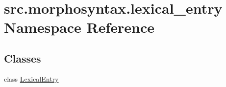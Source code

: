 \hypertarget{namespacesrc_1_1morphosyntax_1_1lexical__entry}{\section{src.\+morphosyntax.\+lexical\+\_\+entry Namespace Reference}
\label{namespacesrc_1_1morphosyntax_1_1lexical__entry}
}
\subsection*{Classes}
\begin{DoxyCompactItemize}
\item 
class \hyperlink{classsrc_1_1morphosyntax_1_1lexical__entry_1_1_lexical_entry}{Lexical\+Entry}
\end{DoxyCompactItemize}
